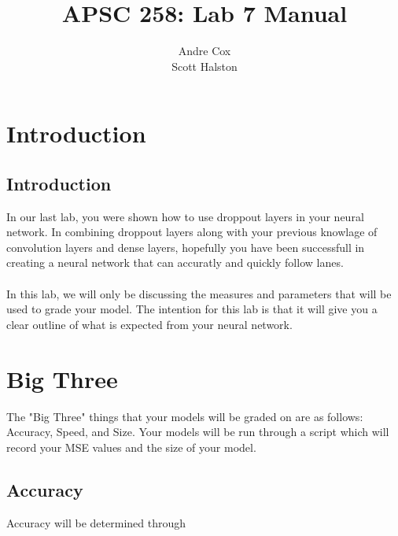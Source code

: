 \documentclass[11pt]{report}
\title{APSC 258: Lab 7 Manual}
\author{Andre Cox \\ Scott Halston}
\begin{document}
\maketitle
\tableofcontents

\clearpage

\chapter{Introduction}
\section{Introduction}
In our last lab, you were shown how to use droppout layers in your neural network. In combining droppout layers along with your previous knowlage of convolution layers and dense layers, hopefully you have been successfull in creating a neural network that can accuratly and quickly follow lanes.
\\ \\
In this lab, we will only be discussing the measures and parameters that will be used to grade your model. The intention for this lab is that it will give you a clear outline of what is expected from your neural network.

\chapter{Big Three}
The "Big Three" things that your models will be graded on are as follows:
    Accuracy, Speed, and Size.
Your models will be run through a script which will record your MSE values and the size of your model.

\section{Accuracy}
Accuracy will be determined through 
\end{document}
